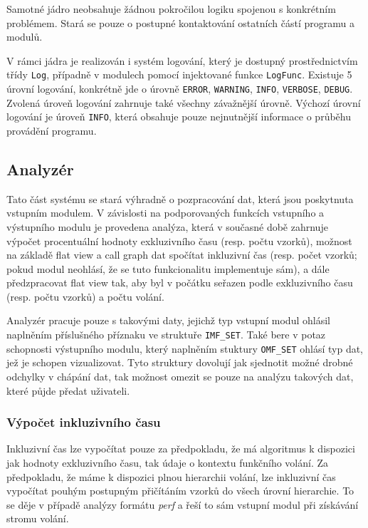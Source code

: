 \documentclass[czech,BP]{thesiskiv}
\begin{document}
Samotné jádro neobsahuje žádnou pokročilou logiku spojenou s konkrétním problémem. Stará se pouze o postupné kontaktování ostatních částí programu a modulů. 

V rámci jádra je realizován i systém logování, který je dostupný prostřednictvím třídy \texttt{Log}, případně v modulech pomocí injektované funkce \texttt{LogFunc}. Existuje 5 úrovní logování, konkrétně jde o úrovně \texttt{ERROR}, \texttt{WARNING}, \texttt{INFO}, \texttt{VERBOSE}, \texttt{DEBUG}. Zvolená úroveň logování zahrnuje také všechny závažnější úrovně. Výchozí úrovní logování je úroveň \texttt{INFO}, která obsahuje pouze nejnutnější informace o průběhu provádění programu.

\subsection{Analyzér}\label{subsec:analyzer}

Tato část systému se stará výhradně o pozpracování dat, která jsou poskytnuta vstupním modulem. V závislosti na podporovaných funkcích vstupního a výstupního modulu je provedena analýza, která v současné době zahrnuje výpočet procentuální hodnoty exkluzivního času (resp. počtu vzorků), možnost na základě flat view a call graph dat spočítat inkluzivní čas (resp. počet vzorků; pokud modul neohlásí, že se tuto funkcionalitu implementuje sám), a dále předzpracovat flat view tak, aby byl v počátku seřazen podle exkluzivního času (resp. počtu vzorků) a počtu volání.

Analyzér pracuje pouze s takovými daty, jejichž typ vstupní modul ohlásil naplněním příslušného příznaku ve struktuře \texttt{IMF\_SET}. Také bere v potaz schopnosti výstupního modulu, který naplněním stuktury \texttt{OMF\_SET} ohlásí typ dat, jež je schopen vizualizovat. Tyto struktury dovolují jak sjednotit možné drobné odchylky v chápání dat, tak možnost omezit se pouze na analýzu takových dat, které půjde předat uživateli.

\subsubsection*{Výpočet inkluzivního času}

Inkluzivní čas lze vypočítat pouze za předpokladu, že má algoritmus k dispozici jak hodnoty exkluzivního času, tak údaje o kontextu funkčního volání. Za předpokladu, že máme k dispozici plnou hierarchii volání, lze inkluzivní čas vypočítat pouhým postupným přičítáním vzorků do všech úrovní hierarchie. To se děje v případě analýzy formátu \emph{perf} a řeší to sám vstupní modul při získávání stromu volání.
\end{document}
